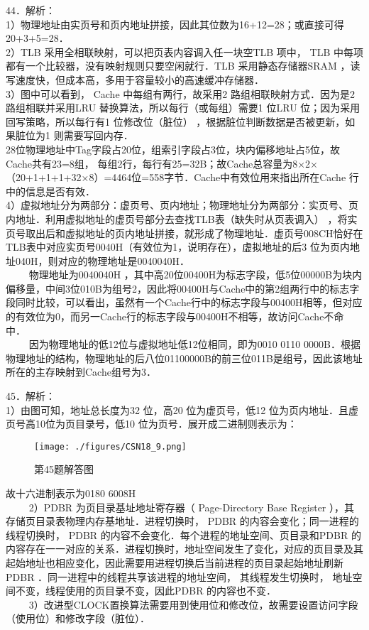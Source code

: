 44．解析： \\
1）物理地址由实页号和页内地址拼接，因此其位数为16+12=28；或直接可得20+3+5=28． \\
2）TLB 采用全相联映射，可以把页表内容调入任一块空TLB 项中， TLB 中每项都有一个比较器，没有映射规则只要空闲就行．TLB 采用静态存储器SRAM ，读写速度快，但成本高，多用于容量较小的高速缓冲存储器． \\
3）图中可以看到， Cache 中每组有两行，故采用2 路组相联映射方式．因为是2 路组相联并采用LRU 替换算法，所以每行（或每组）需要1 位LRU 位；因为采用回写策略，所以每行有1 位修改位（脏位） ，根据脏位判断数据是否被更新，如果脏位为1 则需要写回内存． \\
28位物理地址中Tag字段占20位，组索引字段占3位，块内偏移地址占5位，故Cache共有23=8组， 每组2行，每行有25=32B；故Cache总容量为8×2×（20+1+1+1+32×8）=4464位=558字节．Cache中有效位用来指出所在Cache 行中的信息是否有效． \\
4）虚拟地址分为两部分：虚页号、页内地址；物理地址分为两部分：实页号、页内地址．利用虚拟地址的虚页号部分去查找TLB表（缺失时从页表调入） ，将实页号取出后和虚拟地址的页内地址拼接，就形成了物理地址．虚页号008CH恰好在TLB表中对应实页号0040H（有效位为1，说明存在），虚拟地址的后3 位为页内地址040H，则对应的物理地址是0040040H． \\
$\qquad$ 物理地址为0040040H ，其中高20位00400H为标志字段，低5位00000B为块内偏移量，中间3位010B为组号2，因此将00400H与Cache中的第2组两行中的标志字段同时比较，可以看出，虽然有一个Cache行中的标志字段与00400H相等，但对应的有效位为0，而另一Cache行的标志字段与00400H不相等，故访问Cache不命中． \\
$\qquad$ 因为物理地址的低12位与虚拟地址低12位相同，即为0010 0110 0000B．根据物理地址的结构，物理地址的后八位01100000B的前三位011B是组号，因此该地址所在的主存映射到Cache组号为3．

45．解析： \\
1）由图可知，地址总长度为32 位，高20 位为虚页号，低12 位为页内地址．且虚页号高10位为页目录号，低10 位为页号．展开成二进制则表示为： \\
\begin{figure}[ht]
\centering
\texttt{[image: ./figures/CSN18\_9.png]}
\caption{第45题解答图} \label{CSN18_fig9}
\end{figure}
故十六进制表示为0180 6008H \\
$\qquad$ 2）PDBR 为页目录基址地址寄存器（ Page-Directory Base Register ），其存储页目录表物理内存基地址．进程切换时， PDBR 的内容会变化；同一进程的线程切换时， PDBR 的内容不会变化．每个进程的地址空间、页目录和PDBR 的内容存在一一对应的关系．进程切换时，地址空间发生了变化，对应的页目录及其起始地址也相应变化，因此需要用进程切换后当前进程的页目录起始地址刷新PDBR ．同一进程中的线程共享该进程的地址空间， 其线程发生切换时， 地址空间不变，线程使用的页目录不变，因此PDBR 的内容也不变． \\
$\qquad$ 3）改进型CLOCK置换算法需要用到使用位和修改位，故需要设置访问字段（使用位）和修改字段（脏位）．